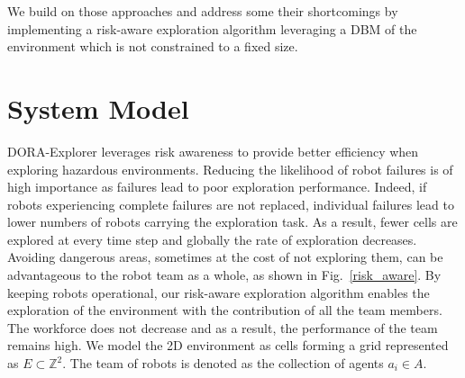 \documentclass[letterpaper, 10 pt, conference]{ieeeconf}
\begin{document}
We build on those approaches and address some their shortcomings by
implementing a risk-aware exploration algorithm leveraging a DBM of
the environment which is not constrained to a fixed size.


\section{System Model}
DORA-Explorer leverages risk awareness to provide better
efficiency when exploring hazardous environments. Reducing the
likelihood of robot failures is of high importance as failures lead to
poor exploration performance. Indeed, if robots experiencing complete
failures are not replaced, individual failures lead to lower numbers
of robots carrying the exploration task. As a result, fewer cells are
explored at every time step and globally the rate of exploration
decreases. Avoiding dangerous areas, sometimes at the cost of not
exploring them, can be advantageous to the robot team as a whole, as
shown in Fig.~\ref{risk_aware}. By keeping robots operational, our
risk-aware exploration algorithm enables the exploration of the
environment with the contribution of all the team members. The
workforce does not decrease and as a result, the performance of the
team remains high. We model the 2D environment as cells forming a grid
represented as $E \subset \mathbb{Z}^2$. The team of robots is denoted
as the collection of agents $a_i \in A$.
\end{document}
